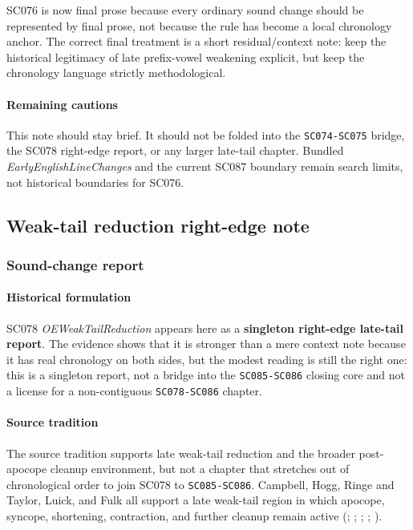 \documentclass[
  british,
  a4paper,
]{article}
\begin{document}
SC076 is now final prose because every ordinary sound change should be
represented by final prose, not because the rule has become a local
chronology anchor. The correct final treatment is a short
residual/context note: keep the historical legitimacy of late
prefix-vowel weakening explicit, but keep the chronology language
strictly methodological.

\paragraph{Remaining cautions}\label{remaining-cautions-47}

This note should stay brief. It should not be folded into the
\texttt{SC074-SC075} bridge, the SC078 right-edge report, or any larger
late-tail chapter. Bundled \emph{EarlyEnglishLineChanges} and the
current SC087 boundary remain search limits, not historical boundaries
for SC076.

\subsection{Weak-tail reduction right-edge
note}\label{weak-tail-reduction-right-edge-note}

\subsubsection{Sound-change report}\label{sound-change-report-48}

\paragraph{Historical formulation}\label{historical-formulation-48}

SC078 \emph{OEWeakTailReduction} appears here as a \textbf{singleton
right-edge late-tail report}. The evidence shows that it is stronger
than a mere context note because it has real chronology on both sides,
but the modest reading is still the right one: this is a singleton
report, not a bridge into the \texttt{SC085-SC086} closing core and not
a license for a non-contiguous \texttt{SC078-SC086} chapter.

\paragraph{Source tradition}\label{source-tradition-48}

The source tradition supports late weak-tail reduction and the broader
post-apocope cleanup environment, but not a chapter that stretches out
of chronological order to join SC078 to \texttt{SC085-SC086}. Campbell,
Hogg, Ringe and Taylor, Luick, and Fulk all support a late weak-tail
region in which apocope, syncope, shortening, contraction, and further
cleanup remain active (; ;
; ; ).
\end{document}
